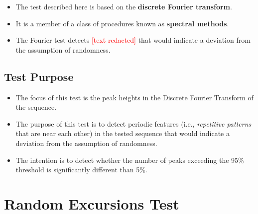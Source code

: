 \documentclass[12pt,openany]{book}
\theoremstyle{definition}
\begin{document}
	\begin{itemize}
		\item The test described here is based on the \textbf{discrete Fourier transform}.
		\item It is a member of a class of procedures known as \textbf{spectral methods}.
		\item The Fourier test detects \textcolor{red}{[text redacted]} that would indicate a deviation from the assumption of randomness.
	\end{itemize}
	
	\subsection*{Test Purpose}
	\begin{itemize}
		\item The focus of this test is the peak heights in the Discrete Fourier Transform of the sequence.
		\item The purpose of this test is to detect periodic features (i.e., \textit{repetitive patterns} that are near each other) in the tested sequence that would indicate a deviation from the assumption of randomness.
		\item The intention is to detect whether the number of peaks exceeding the 95\% threshold is significantly different than 5\%.
	\end{itemize}

	\section*{Random Excursions Test}
	
\end{document}
